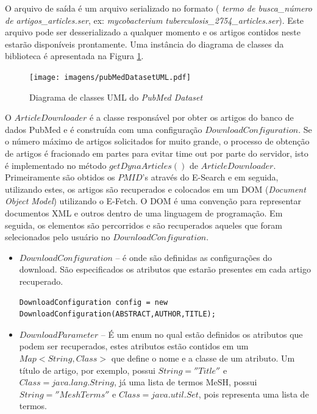 O arquivo de saída é um arquivo serializado no formato ( \emph{termo de busca\_número de artigos\_articles.ser}, ex: \emph{mycobacterium tuberculosis\_2754\_articles.ser}). Este arquivo pode ser desserializado a qualquer momento e os artigos contidos neste estarão disponíveis prontamente. Uma instância do diagrama de classes da biblioteca é apresentada na Figura \ref{fig:pubMedDatasetUML}.
\begin{figure}[h!]
    \center    
    \texttt{[image: imagens/pubMedDatasetUML.pdf]}
    \caption{Diagrama de classes UML do \emph{PubMed Dataset} \label{fig:pubMedDatasetUML}}
\end{figure}

O  $ArticleDownloader$ é a classe responsável por obter os artigos do banco de dados PubMed e é construída com uma configuração $DownloadConfiguration$. Se o número máximo de artigos solicitados for muito grande, o processo de obtenção de artigos é fracionado em partes para evitar time out por parte do servidor, isto é implementado no método $getDynaArticles()$ de $ArticleDownloader$. Primeiramente são obtidos os $PMID$’s através do E-Search e em seguida, utilizando estes, os artigos são recuperados e colocados em um DOM (\emph{Document Object Model}) utilizando o E-Fetch. O DOM é uma convenção para representar documentos XML e outros dentro de uma linguagem de programação. Em seguida, os elementos são percorridos e são
recuperados aqueles que foram selecionados pelo usuário no $DownloadConfiguration$.

\begin{itemize}
\item $DownloadConfiguration$ – é onde são definidas as configurações do download. São especificados os atributos que estarão presentes em cada artigo recuperado.
\begin{lstlisting}
DownloadConfiguration config = new DownloadConfiguration(ABSTRACT,AUTHOR,TITLE);
\end{lstlisting}

\item $DownloadParameter$ – É um enum no qual estão definidos os atributos que podem ser recuperados, estes atributos estão contidos em um $Map<String,Class>$ que define o nome e a classe de um atributo. Um título de artigo, por exemplo, possui $String = ''Title''$ e $Class = java.lang.String$, já uma lista de termos MeSH, possui $String = ''MeshTerms''$ e $Class = java.util.Set$, pois representa uma lista de termos.
\end{itemize}


